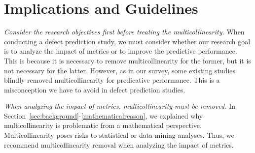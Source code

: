 \section{ Implications and Guidelines}
\label{subsecPracticalGuideline}
\emph{Consider the research objectives first before treating the multicollinearity.}
When conducting a defect prediction study, we must consider whether our research goal is to analyze the impact of metrics or to improve the predictive performance. This is because it is necessary to remove multicollinearity for the former, but it is not necessary for the latter. However, as in our survey, some existing studies blindly removed multicollinearity for predicative performance. This is a misconception we have to avoid in defect prediction studies.

\emph{When analyzing the impact of metrics, multicollinearity must be removed.}
In Section~\ref{sec:background}-\ref{mathematicalreason}, we explained why multicollinearity is problematic from a mathematical perspective. Multicollinearity poses risks to statistical or data-mining analyses.
Thus, we recommend multicollinearity removal when analyzing the impact of metrics. %


